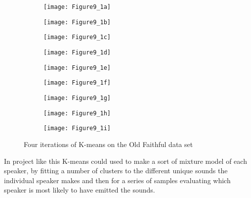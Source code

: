 \textbf{}
\begin{figure}[H]
	\centering
	\begin{subfigure}[H]{0.3\linewidth}
		\texttt{[image: Figure9\_1a]}
		\label{fig:F9.1a}
	\end{subfigure}
	\quad
	\begin{subfigure}[H]{0.3\linewidth}
		\texttt{[image: Figure9\_1b]}
		\label{fig:F9.1b}
	\end{subfigure}
	\quad
	\begin{subfigure}[H]{0.3\linewidth}
		\texttt{[image: Figure9\_1c]}
		\label{fig:F9.1c}
	\end{subfigure}
	
	
	\begin{subfigure}[H]{0.3\linewidth}
		\texttt{[image: Figure9\_1d]}
		\label{fig:F9.1d}
	\end{subfigure}
	\quad
	\begin{subfigure}[H]{0.3\linewidth}
		\texttt{[image: Figure9\_1e]}
		\label{fig:F9.1e}
	\end{subfigure}
	\quad
	\begin{subfigure}[H]{0.3\linewidth}
		\texttt{[image: Figure9\_1f]}
		\label{fig:F9.1f}
	\end{subfigure}
	

	\begin{subfigure}[H]{0.3\linewidth}
		\texttt{[image: Figure9\_1g]}
		\label{fig:F9.1g}
	\end{subfigure}
	\quad
	\begin{subfigure}[H]{0.3\linewidth}
		\texttt{[image: Figure9\_1h]}
		\label{fig:F9.1h}
	\end{subfigure}
	\quad
	\begin{subfigure}[H]{0.3\linewidth}
		\texttt{[image: Figure9\_1i]}
		\label{fig:F9.1i}
	\end{subfigure}
	
	\caption{Four iterations of K-means on the Old Faithful data set}

\end{figure}

In project like this K-means could used to make a sort of mixture model of each speaker, by fitting a number of clusters to the different unique sounds the individual speaker makes and then for a series of samples evaluating which speaker is most likely to have emitted the sounds.
  